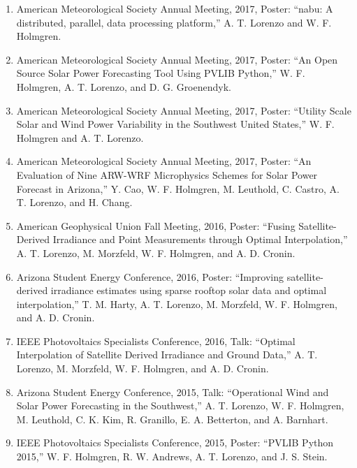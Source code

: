 \begin{enumerate}

\item American Meteorological Society Annual Meeting, 2017, Poster:
  ``nabu: A distributed, parallel, data processing platform,''
  A. T. Lorenzo and W. F. Holmgren.

\item American Meteorological Society Annual Meeting, 2017, Poster:
  ``An Open Source Solar Power Forecasting Tool Using PVLIB Python,''
  W. F. Holmgren, A. T. Lorenzo, and D. G. Groenendyk.

\item American Meteorological Society Annual Meeting, 2017, Poster:
  ``Utility Scale Solar and Wind Power Variability in the Southwest
  United States,''
  W. F. Holmgren and A. T. Lorenzo.

\item American Meteorological Society Annual Meeting, 2017, Poster:
  ``An Evaluation of Nine ARW-WRF Microphysics Schemes for Solar Power
  Forecast in Arizona,''
  Y. Cao, W. F. Holmgren, M. Leuthold, C. Castro, A. T. Lorenzo, and
  H. Chang.

\item American Geophysical Union Fall Meeting, 2016, Poster:
  ``Fusing Satellite-Derived Irradiance and Point Measurements through
  Optimal Interpolation,''
  A. T. Lorenzo, M. Morzfeld, W. F. Holmgren, and A. D. Cronin.

\item Arizona Student Energy Conference, 2016, Poster:
  ``Improving satellite-derived irradiance estimates using sparse
  rooftop solar data and optimal interpolation,''
  T. M. Harty, A. T. Lorenzo, M. Morzfeld, W. F. Holmgren, and
  A. D. Cronin.

\item IEEE Photovoltaics Specialists Conference, 2016, Talk:
  ``Optimal Interpolation of Satellite Derived Irradiance and Ground
  Data,''
  A. T. Lorenzo, M. Morzfeld, W. F. Holmgren, and A. D. Cronin.

\item Arizona Student Energy Conference, 2015, Talk:
  ``Operational Wind and Solar Power Forecasting in the Southwest,''
  A. T. Lorenzo, W. F. Holmgren, M. Leuthold, C. K. Kim, R. Granillo,
  E. A. Betterton, and A. Barnhart.

\item IEEE Photovoltaics Specialists Conference, 2015, Poster:
  ``PVLIB Python 2015,''
  W. F. Holmgren, R. W. Andrews, A. T. Lorenzo, and J. S. Stein.


\end{enumerate}
